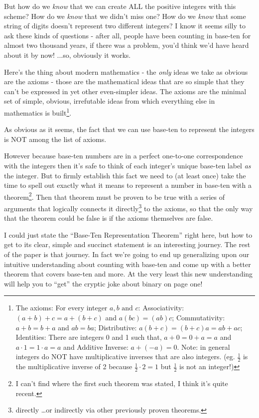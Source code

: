 \documentclass{article}
\begin{document}
But how do we \emph{know} that we can create ALL the positive
integers with this scheme?
How do we \emph{know} that we didn't miss one?
How do we \emph{know} that some string of
digits doesn't represent two different integers?
I know it seems silly to ask these kinds of questions - 
after all, people have been counting in base-ten for almost two thousand years,
if there was a problem, you'd think we'd have heard about it by now! ...so, obviously it works.

Here's the thing about modern mathematics - the \emph{only} ideas we take as obvious
are the axioms - those are the mathematical ideas that
are so simple that they can't be expressed in
yet other even-simpler ideas. The axioms are the minimal set of simple,
obvious, irrefutable ideas from which
everything else in mathematics is built\footnote{The axioms:
For every integer $a,b\text{ and }c$:
Associativity: $(a+b)+c=a+(b+c)$ and $a(bc)=(ab)c$;
Commutativity: $a+b=b+a$ and $ab=ba$;
Distributive: $a(b+c)=(b+c)a=ab+ac$;
Identities: There are integers 0 and 1 such that,
$a+0=0+a=a$ and $a\cdot{}1=1\cdot{}a=a$ and
Additive Inverse: $a+(-a)=0$.
Note: in general integers do NOT have multiplicative inverses 
that are also integers. (eg. $\frac{1}{2}$ is the multiplicative
inverse of 2 because $\frac{1}{2}\cdot{}2=1$ but $\frac{1}{2}$ is not an integer!)}.

As obvious as it seems, the fact that
we can use base-ten to represent the integers is NOT among the list of axioms.

However because base-ten numbers are in
a perfect one-to-one correspondence with the integers then
it's safe to think of each
integer's unique base-ten label \emph{as} the integer.
But to firmly establish this fact we need to (at least once) take the time to
spell out exactly what it means to represent a number in base-ten with a theorem\footnote{I can't find where
the first such theorem was stated, I think it's quite recent.}. Then that theorem must be proven to
be true with a series of arguments that logically connects it
directly\footnote{directly \dots{}or indirectly
via other previously proven theorems.} to the axioms, so that the only way
that the theorem could be false is if the axioms themselves are false.

I could just state the ``Base-Ten Representation Theorem'' right here, but
how to get to its clear, simple and succinct statement is an interesting journey.
The rest of the paper is that journey. In fact we're going to end up generalizing upon our
intuitive understanding about
counting with base-ten and come up with a
better theorem that covers base-ten and more. At the very least this new understanding
will help you to ``get'' the cryptic joke about binary on page one!
\end{document}

